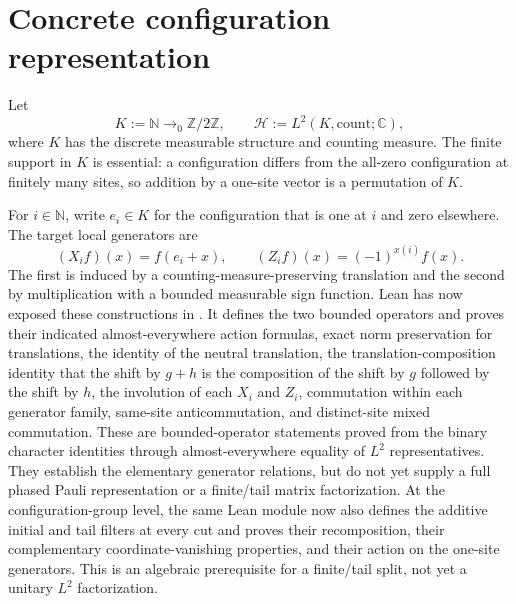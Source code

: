 \documentclass[11pt,reqno]{amsart}
\numberwithin{equation}{section}
\theoremstyle{definition}
\theoremstyle{remark}
\newcommand{\cH}{\mathcal H}
\newcommand{\bbC}{\mathbb C}
\begin{document}
\section{Concrete configuration representation}
\label{sec:configuration_representation}

Let
\begin{equation}
  K:=\mathbb N\to_0\mathbb Z/2\mathbb Z,
  \qquad
  \cH:=L^2(K,\mathrm{count};\bbC),
  \label{eq:configuration_space}
\end{equation}
where $K$ has the discrete measurable structure and counting measure.  The
finite support in $K$ is essential: a configuration differs from the all-zero
configuration at finitely many sites, so addition by a one-site vector is a
permutation of $K$.

For $i\in\mathbb N$, write $e_i\in K$ for the configuration that is one at
$i$ and zero elsewhere.  The target local generators are
\begin{equation}
  (X_i f)(x)=f(e_i+x),
  \qquad
  (Z_i f)(x)=(-1)^{x(i)}f(x).
  \label{eq:shift_phase_generators}
\end{equation}
The first is induced by a counting-measure-preserving translation and the
second by multiplication with a bounded measurable sign function.  Lean has
now exposed these constructions in
.
It defines the two bounded operators and proves their indicated
almost-everywhere action formulas, exact norm preservation for translations,
the identity of the neutral translation, the translation-composition identity
that the shift by $g+h$ is the composition of the shift by $g$ followed by
the shift by $h$, the involution of each $X_i$ and $Z_i$, commutation within
each generator family, same-site anticommutation, and distinct-site mixed
commutation.  These are bounded-operator statements proved from the binary
character identities through almost-everywhere equality of $L^2$
representatives.  They establish the elementary generator relations, but do
not yet supply a full phased Pauli representation or a finite/tail matrix
factorization.  At the configuration-group level, the same Lean module now
also defines the additive initial and tail filters at every cut and proves
their recomposition, their complementary coordinate-vanishing properties, and
their action on the one-site generators.  This is an algebraic prerequisite
for a finite/tail split, not yet a unitary $L^2$ factorization.
\end{document}
